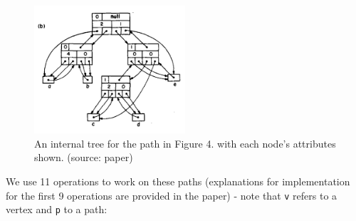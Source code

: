 \documentclass[a4paper, 11pt]{article}
\begin{document}
\begin{figure}
    \centering
    \includegraphics[width=0.5\textwidth]{img/diagrams/internal_tree.png}
    \caption{An internal tree for the path in Figure 4. with each node's attributes shown.  (source: paper)}
    \label{fig:6}
\end{figure}

We use 11 operations to work on these paths (explanations for implementation for the first 9 operations are provided in the paper) - note that \texttt{v} refers to a vertex and \texttt{p} to a path:
\end{document}
